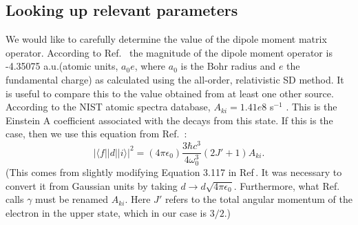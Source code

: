 
\subsection{Looking up relevant parameters} \label{lookItUp}
We would like to carefully determine the value of the dipole moment matrix operator. According to Ref.\ \cite{safronova2photon} the magnitude of the dipole moment operator is -4.35075 a.u.(atomic units, $a_0 e$, where $a_0$ is the Bohr radius and $e$ the fundamental charge) as calculated using the all-order, relativistic SD method. It is useful to compare this to the value obtained from at least one other source.%
According to the NIST atomic spectra database, $A_{ki}=1.41e8$ s$^{-1}$ \cite{NISTasd}. This is the Einstein A coefficient associated with the decays from this state. If this is the case, then we use this equation from Ref.\ \cite{demilleBudkerKimball}:  
\begin{equation}
|\langle f ||d|| i \rangle|^2 = (4 \pi \epsilon_0) \frac{3 \hbar c^3}{4 \omega_0^3} (2 J'+1) A_{ki}\label{budkerAeqn}.
\end{equation}
(This comes from slightly modifying Equation 3.117 in Ref\,\cite{demilleBudkerKimball}. It was necessary to convert it from Gaussian units by taking $d\rightarrow d \sqrt{4 \pi \epsilon_0}$. Furthermore, what Ref.\ \cite{demilleBudkerKimball} calls $\gamma$ must be renamed $A_{ki}$. Here $J'$ refers to the total angular momentum of the electron in the upper state, which in our case is $3/2$.) 

